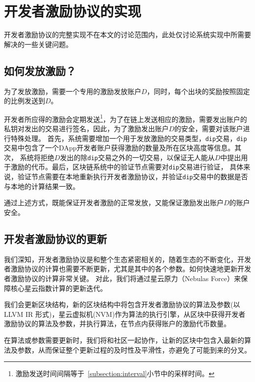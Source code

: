 \section{开发者激励协议的实现}
开发者激励协议的完整实现不在本文的讨论范围内，此处仅讨论系统实现中所需要解决的一些关键问题。

\subsection{如何发放激励？}
为了发放激励，需要一个专用的激励发放账户$D$，同时，每个出块的奖励按照固定的比例发送到$D$。

开发者所应得的激励会定期发送\footnote{激励发送时间间隔等于~\ref{subsection:interval}小节中的采样时间。}，为了在链上发送相应的激励，需要发出账户的私钥对发出的交易进行签名，因此，为了激励发出账户$D$的安全，需要对该账户进行特殊处理。
首先，系统需要增加一个用于发放激励的交易类型，\texttt{dip}交易，\texttt{dip}交易中包含了一个DApp开发者账户获得激励的数量及所在区块高度等信息。其次，
系统将拒绝$D$发出的除\texttt{dip}交易之外的一切交易，以保证无人能从$D$中提出用于激励的代币。最后，区块链系统中的验证节点需要对\texttt{dip}交易进行验证，
具体来说，验证节点需要在本地重新执行开发者激励协议，并验证\texttt{dip}交易中的数据是否与本地的计算结果一致。

通过上述方式，既能保证开发者激励的正常发放，又能保证激励发出账户$D$的账户安全。

\subsection{开发者激励协议的更新}
我们深知，开发者激励协议是和整个生态紧密相关的，随着生态的不断变化，开发者激励协议的计算也需要不断更新，尤其是其中的各个参数。如何快速地更新开发者激励协议的计算非常关键。
对此，我们将通过星云原力（Nebulas Force）来保障核心星云指数计算的更新迭代。

我们会更新区块结构，新的区块结构中将包含开发者激励协议的算法及参数(以 LLVM IR 形式)，星云虚拟机(NVM)作为算法的执行引擎，从区块中获得开发者激励协议的算法及参数，并执行算法，在节点内获得账户的激励代币数量。

在算法或参数需要更新时，我们将和社区一起协作，让新的区块中包含入最新的算法及参数，从而保证整个更新过程的及时性及平滑性，亦避免了可能到来的分叉。

